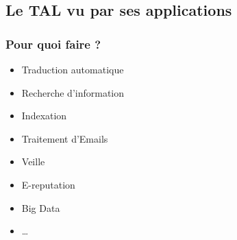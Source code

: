 \begin{frame}

\end{frame}

\subsection{Le TAL vu par ses applications}


\begin{frame}
\frametitle{Pour quoi faire ?}

\begin{itemize}
\item Traduction automatique
\item Recherche d'information
\item Indexation
\item Traitement d'Emails
\item Veille
\item E-reputation
\item Big Data
\item \ldots
\end{itemize}

\end{frame}


